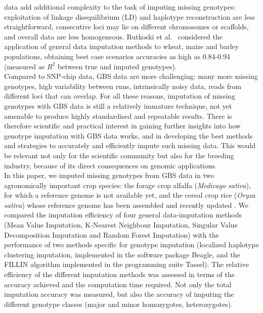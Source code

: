 data add additional complexity to the task of imputing missing genotypes: 
exploitation of linkage disequilibrium (LD) and haplotype reconstruction 
are less straightforward, consecutive loci may lie on different chromosomes
or scaffolds, and overall data are less homogeneous. Rutkoski et al.~\cite{rutkoski_imputation_2013}
considered the application of general data imputation methods 
to wheat, maize and barley populations, obtaining best case scenarios accuracies 
as high as 0.84-0.94 (measured as $R^{2}$ between true and imputed genotypes).\\
Compared to SNP-chip data, GBS data are more challenging: many more 
missing genotypes, high variability between runs, intrinsically noisy data, 
reads from different loci that can overlap. For all these reasons, imputation 
of missing genotypes with GBS data is still a relatively immature technique, 
not yet amenable to produce highly standardised and repeatable results. 
There is therefore scientific and practical interest in gaining further 
insights into how genotype imputation with GBS data works, and in 
developing the best methods and strategies to accurately and efficiently 
impute such missing data. This would be relevant not only for the scientific 
community but also for the breeding industry, because of its direct 
consequences on genomic applications.\\
In this paper, we imputed missing genotypes from GBS data in two agronomically
important crop species: the forage crop alfalfa (\emph{Medicago sativa}), for 
which a reference genome is not available yet, and the 
cereal crop rice (\emph{Oryza sativa}) whose reference genome has been 
assembled \cite{international_rice_genome_sequencing_project_map-based_2005} and
recently updated \cite{kawahara_improvement_2013}. We compared the imputation 
efficiency of four general data-imputation methods (Mean Value Imputation, 
K-Nearest Neighbour Imputation, Singular Value Decomposition Imputation 
and Random Forest Imputation) with the performance of two methods specific 
for genotype imputation (localized haplotype clustering imputation, 
implemented in the software package Beagle, %
and the FILLIN algorithm implemented in the programming suite Tassel). The relative efficiency of 
the different imputation methods was assessed in terms of the 
accuracy achieved and the computation time required. Not only the total imputation accuracy was measured, but also the accuracy of imputing the different genotype classes (major and minor homozygotes, heterozygotes).\\
